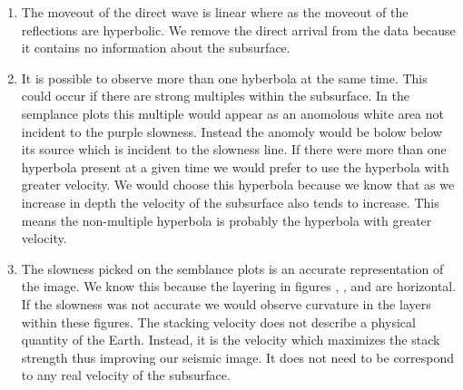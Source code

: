 \begin{enumerate}

  \item The moveout of the direct wave is linear where as the moveout of the reflections are hyperbolic. We remove the direct arrival from the data because it contains no information about the subsurface.



  \item It is possible to observe more than one hyberbola at the same time. This could occur if there are strong multiples within the subsurface. In the semplance plots this multiple would appear as an anomolous white area not incident to the purple slowness. Instead the anomoly would be bolow below its source which is incident to the slowness line.  If there were more than one hyperbola present at a given time we would prefer to use the hyperbola with greater velocity. We would choose this hyperbola because we know that as we increase in depth the velocity of the subsurface also tends to increase. This means the non-multiple hyperbola is probably the hyperbola with greater velocity.



  \item The slowness picked on the semblance plots is an accurate representation of the image. We know this because the layering in figures , , and  are horizontal. If the slowness was not accurate we would observe curvature in the layers within these figures. The stacking velocity does not describe a physical quantity of the Earth. Instead, it is the velocity which maximizes the stack strength thus improving our seismic image. It does not need to be correspond to any real velocity of the subsurface.



\end{enumerate}
